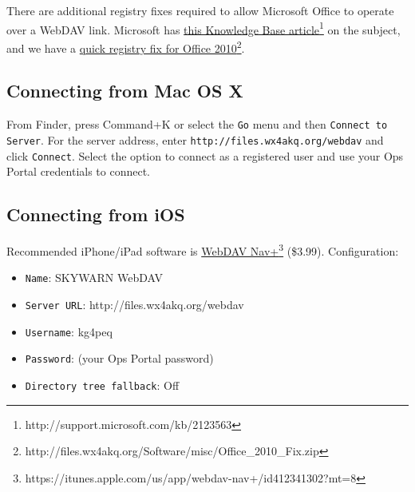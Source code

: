 \documentclass[pdflatex,letterpaper,twoside,12pt]{book}
\begin{document}
There are additional registry fixes required to allow Microsoft Office to operate over a WebDAV link. Microsoft has \href{http://support.microsoft.com/kb/2123563}{this Knowledge Base article}\footnote{http://support.microsoft.com/kb/2123563} on the subject, and we have a \href{http://files.wx4akq.org/Software/misc/Office\_2010\_Fix.zip}{quick registry fix for Office 2010}\footnote{http://files.wx4akq.org/Software/misc/Office\_2010\_Fix.zip}.

\subsection{Connecting from Mac OS X}

From Finder, press Command+K or select the \texttt{Go} menu and then \texttt{Connect to Server}.  For the server address, enter \texttt{http://files.wx4akq.org/webdav} and click \texttt{Connect}.  Select the option to connect as a registered user and use your Ops Portal credentials to connect.

\subsection{Connecting from iOS}

Recommended iPhone/iPad software is \href{https://itunes.apple.com/us/app/webdav-nav+/id412341302?mt=8}{WebDAV Nav+}\footnote{https://itunes.apple.com/us/app/webdav-nav+/id412341302?mt=8} (\$3.99). Configuration:

\begin{itemize}
\item \texttt{Name}: SKYWARN WebDAV
\item \texttt{Server URL}: http://files.wx4akq.org/webdav
\item \texttt{Username}: kg4peq
\item \texttt{Password}: (your Ops Portal password)
\item \texttt{Directory tree fallback}: Off
\end{itemize}

\end{document}
